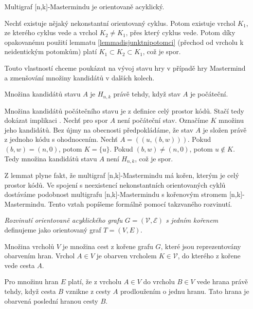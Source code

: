 \begin{lemma}
    Multigraf [n,k]-Mastermindu je orientovaně acyklický. 
\end{lemma}
\begin{dukaz}
    Nechť existuje nějaký nekonstantní orientovaný cyklus. Potom existuje vrchol $K_1$, ze kterého cyklus vede a vrchol $K_2 \neq K_1$, přes který cyklus vede. Potom díky opakovanému použití lemmatu \ref{lemmadisjunktnipotomci} (přechod od vrcholu k neidentickým potomkům) platí $K_1 \subset K_2 \subset K_1$, což je spor. 
\end{dukaz}
Touto vlastností chceme poukázat na vývoj stavu hry v případě hry Mastermind a zmenšování množiny kandidátů v dalších kolech. 

\begin{lemma}\label{lemmakandidatipocstavu}
    Množina kandidátů stavu $A$ je $H_{n,k}$ právě tehdy, když stav $A$ je počáteční.
\end{lemma}
\begin{dukaz}
    Množina kandidátů počátečního stavu je z definice celý prostor kódů. Stačí tedy dokázat implikaci \uv{\Rightarrow}. Nechť pro spor $A$ není počáteční stav. Označíme $K$ množinu jeho kandidátů. Bez újmy na obecnosti předpokládáme, že stav $A$ je složen právě z jednoho kódu s ohodnocením. Nechť $A = ((u, (b,w)))$. Pokud $(b,w) = (n,0)$, potom $K = \{u\}$. Pokud $(b,w) \neq (n,0)$, potom $u \notin K$. Tedy množina kandidátů stavu $A$ není $H_{n,k}$, což je spor. 
\end{dukaz}

Z lemmat plyne fakt, že multigraf [n,k]-Mastermindu má kořen, kterým je celý prostor kódů. Ve spojení s neexistencí nekonstantních orientovaných cyklů dostáváme podobnost multigrafu [n,k]-Mastermindu s kořenovým stromem [n,k]-Mastermindu. Tento vztah popíšeme formálně pomocí takzvaného rozvinutí.
\begin{definice}
    \emph{Rozvinutí orientovaně acyklického grafu $G = (\mathcal{V}, \mathcal{E})$ s jedním kořenem} definujeme jako orientovaný graf $T = (V, E)$.
    
    Množina vrcholů $V$ je množina cest z kořene grafu $G$, které jsou reprezentovány obarvením hran. Vrchol $A \in V$ je obarven vrcholem $K \in \mathcal{V}$, do kterého z kořene vede cesta $A$. 
    
    Pro množinu hran $E$ platí, že z vrcholu $A \in V$ do vrcholu $B \in V$ vede hrana právě tehdy, když cesta $B$ vznikne z cesty $A$ prodloužením o jednu hranu. Tato hrana je obarvená poslední hranou cesty $B$. 
\end{definice}

